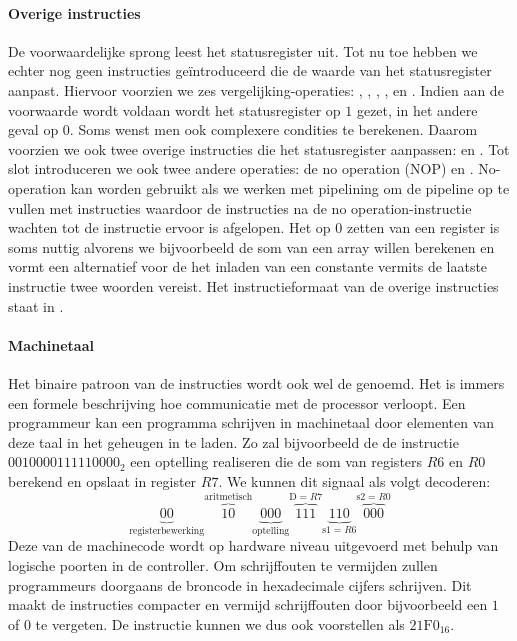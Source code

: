 \paragraph{Overige instructies}
De voorwaardelijke sprong leest het statusregister uit. Tot nu toe hebben we echter nog geen instructies ge\"introduceerd die de waarde van het statusregister aanpast. Hiervoor voorzien we zes vergelijking-operaties: , , , ,  en . Indien aan de voorwaarde wordt voldaan wordt het statusregister op $1$ gezet, in het andere geval op $0$. Soms wenst men ook complexere condities te berekenen. Daarom voorzien we ook twee overige instructies die het statusregister aanpassen:  en . Tot slot introduceren we ook twee andere operaties: de no operation (NOP) en . No-operation kan worden gebruikt als we werken met pipelining om de pipeline op te vullen met instructies waardoor de instructies na de no operation-instructie wachten tot de instructie ervoor is afgelopen. Het op $0$ zetten van een register is soms nuttig alvorens we bijvoorbeeld de som van een array willen berekenen en vormt een alternatief voor de het inladen van een constante vermits de laatste instructie twee woorden vereist. Het instructieformaat van de overige instructies staat in .
\paragraph{Machinetaal}
Het binaire patroon van de instructies wordt ook wel de  genoemd. Het is immers een formele beschrijving hoe communicatie met de processor verloopt. Een programmeur kan een programma schrijven in machinetaal door elementen van deze taal in het geheugen in te laden. Zo zal bijvoorbeeld de de instructie $0010000111110000_2$ een optelling realiseren die de som van registers $R6$ en $R0$ berekend en opslaat in register $R7$. We kunnen dit signaal als volgt decoderen:
\begin{equation}
\underbrace{00}_{\mbox{registerbewerking}}\overbrace{10}^{\mbox{aritmetisch}}\underbrace{000}_{\mbox{optelling}}\overbrace{111}^{\mbox{D}=R7}\underbrace{110}_{\mbox{s1}=R6}\overbrace{000}^{\mbox{s2}=R0}
\end{equation}
Deze  van de machinecode wordt op hardware niveau uitgevoerd met behulp van logische poorten in de controller. Om schrijffouten te vermijden zullen programmeurs doorgaans de broncode in hexadecimale cijfers schrijven. Dit maakt de instructies compacter en vermijd schrijffouten door bijvoorbeeld een $1$ of $0$ te vergeten. De instructie kunnen we dus ook voorstellen als $21\mbox{F}0_{16}$.
